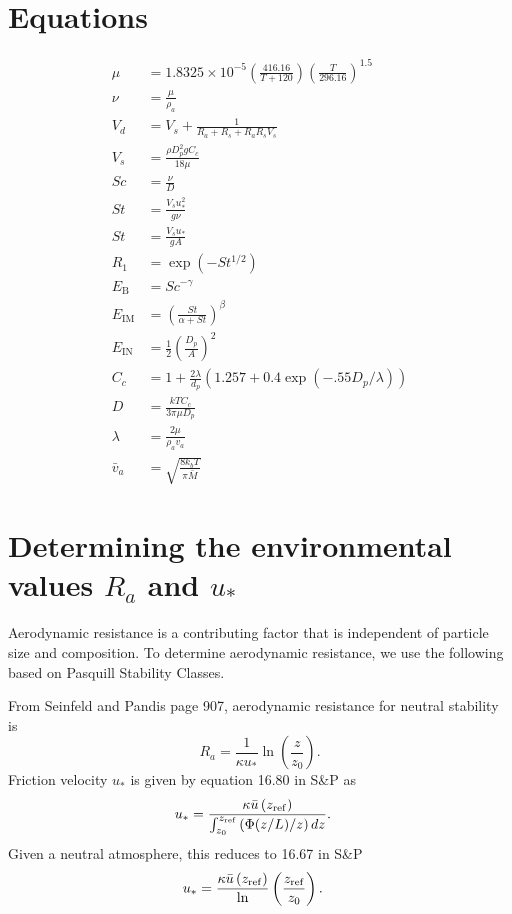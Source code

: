 \documentclass{article}
\begin{document}

\section{Equations}
\label{sec:equations}

\begin{align}
\mu & =  1.8325 \times 10^{-5}\left(\frac{416.16}{T + 120}\right)\left(\frac{T}{296.16}\right)^{1.5}\label{eq:dynamic_visc}\\
\nu & = \frac{\mu}{\rho_a}  \label{eq:kinematic_visc}\\
V_d &= V_s + \frac{1}{R_a + R_s + R_aR_sV_s} \label{eq:vd}\\
V_s & = \frac{\rho D_p^2gC_c}{18\mu } \label{eq:vs}\\
Sc &= \frac{\nu}{D}   \label{eq:sc} \\
St &= \frac{V_su_*^2}{g \nu } \label{eq:st_smooth}\\
St &= \frac{V_s u_*}{gA}  \label{eq:st_veg}\\
R_1 &= \exp(-St^{1/2}) \label{eq:R_1}\\
E_{\textrm{B}} &= Sc^{-\gamma}  \label{eq:eb}\\
E_{\textrm{IM}} & = \left(\frac{St}{\alpha + St}\right)^{\beta} \label{eq:eim}\\
E_{\textrm{IN}} &= \frac{1}{2} \left(\frac{D_p}{A}\right)^2 \label{eq:ein}\\
C_c & = 1 + \frac{2 \lambda}{d_p}\left(1.257 + 0.4\exp(-.55 D_p/\lambda)\right)  \label{eq:cc}\\ 
D & = \frac{kTC_c}{3 \pi \mu D_p}  \label{eq:brownian}\\
\lambda & = \frac{2 \mu}{\rho_a v_a} \label{eq:lambda}\\
\bar{v}_a & = \sqrt{\frac{8k_bT}{\pi\bar{M}}} \label{eq:thermal}
\end{align}

\section{Determining the environmental values $R_a$ and $u_*$}

Aerodynamic resistance is a contributing factor that is independent of particle size
and composition. To determine aerodynamic resistance, we use the following
based on Pasquill Stability Classes.

From Seinfeld and Pandis page 907, aerodynamic resistance for neutral stability is
\begin{equation}
R_a =
\frac{1}{\kappa u_*} \ln \left( \frac{z}{z_0} \right).
\end{equation}
Friction velocity $u_{*}$ is given by equation 16.80 in S\&P as
\begin{align}
u_* & = \frac{\kappa \bar{u}\left(z_{\rm ref}\right)}
  {\int_{z_0}^{z_{\rm ref}} \left(\Phi (z/L)/z\right)dz}.
\end{align}
Given a neutral atmosphere, this reduces to 16.67 in S\&P
\begin{align}
u_* & = \frac{\kappa \bar{u}\left(z_{\rm ref}\right)}
  \ln \left(\frac{z_{\rm ref}}{z_0}\right).
\end{align}
\end{document}
